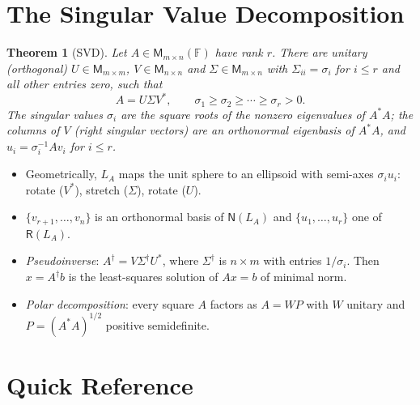 \documentclass[12pt]{article}
\newtheorem{theorem}{Theorem}[section]
\theoremstyle{definition}
\theoremstyle{remark}
\newcommand{\F}{\mathbb{F}}
\newcommand{\N}{\mathsf{N}}
\newcommand{\Rg}{\mathsf{R}}
\newcommand{\M}{\mathsf{M}}
\begin{document}
\section{The Singular Value Decomposition}

\begin{theorem}[SVD]
Let $A\in\M_{m\times n}(\F)$ have rank $r$. There are unitary (orthogonal) $U\in\M_{m\times m}$, $V\in\M_{n\times n}$ and
$\Sigma\in\M_{m\times n}$ with $\Sigma_{ii}=\sigma_i$ for $i\le r$ and all other entries zero, such that
\[
A=U\Sigma V^*,\qquad \sigma_1\ge\sigma_2\ge\cdots\ge\sigma_r>0 .
\]
The \emph{singular values} $\sigma_i$ are the square roots of the nonzero eigenvalues of $A^*A$; the columns of $V$ (right singular vectors)
are an orthonormal eigenbasis of $A^*A$, and $u_i=\sigma_i^{-1}Av_i$ for $i\le r$.
\end{theorem}

\begin{itemize}
  \item Geometrically, $L_A$ maps the unit sphere to an ellipsoid with semi-axes $\sigma_iu_i$: rotate ($V^*$), stretch ($\Sigma$), rotate ($U$).
  \item $\{v_{r+1},\dots,v_n\}$ is an orthonormal basis of $\N(L_A)$ and $\{u_1,\dots,u_r\}$ one of $\Rg(L_A)$.
  \item \emph{Pseudoinverse}: $A^\dagger=V\Sigma^\dagger U^*$, where $\Sigma^\dagger$ is $n\times m$ with entries $1/\sigma_i$. Then $x=A^\dagger b$ is the
        least-squares solution of $Ax=b$ of minimal norm.
  \item \emph{Polar decomposition}: every square $A$ factors as $A=WP$ with $W$ unitary and $P=(A^*A)^{1/2}$ positive semidefinite.
\end{itemize}

\section{Quick Reference}
\end{document}

